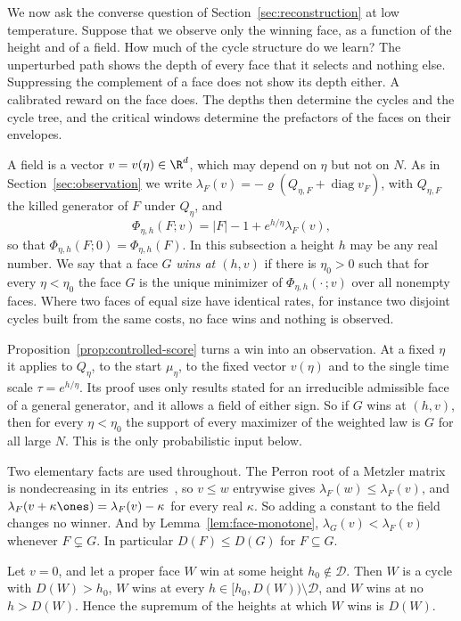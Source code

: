 We now ask the converse question of Section~\ref{sec:reconstruction} at low
temperature. Suppose that we observe only the winning face, as a function of
the height and of a field. How much of the cycle structure do we learn? The
unperturbed path shows the depth of every face that it selects and nothing
else. Suppressing the complement of a face does not show its depth either. A
calibrated reward on the face does. The depths then determine the cycles and
the cycle tree, and the critical windows determine the prefactors of the faces
on their envelopes.

A field is a vector $v=v(\eta)\in\R^d$, which may depend on $\eta$ but not on
$N$. As in Section~\ref{sec:observation} we write
$\lambda_F(v)=-\varrho(Q_{\eta,F}+\operatorname{diag}v_F)$, with $Q_{\eta,F}$ the
killed generator of $F$ under $Q_\eta$, and
\[
 \Phi_{\eta,h}(F;v)=|F|-1+e^{h/\eta}\lambda_F(v),
\]
so that $\Phi_{\eta,h}(F;0)=\Phi_{\eta,h}(F)$. In this subsection a height $h$
may be any real number. We say that a face $G$ \emph{wins at $(h,v)$} if there
is $\eta_0>0$ such that for every $\eta<\eta_0$ the face $G$ is the unique
minimizer of $\Phi_{\eta,h}(\cdot\,;v)$ over all nonempty faces. Where two
faces of equal size have identical rates, for instance two disjoint cycles
built from the same costs, no face wins and nothing is observed.

Proposition~\ref{prop:controlled-score} turns a win into an observation. At a
fixed $\eta$ it applies to $Q_\eta$, to the start $\mu_\eta$, to the fixed
vector $v(\eta)$ and to the single time scale $\tau=e^{h/\eta}$. Its proof uses
only results stated for an irreducible admissible face of a general generator,
and it allows a field of either sign. So if $G$ wins at $(h,v)$, then for every
$\eta<\eta_0$ the support of every maximizer of the weighted law is $G$ for all
large $N$. This is the only probabilistic input below.

Two elementary facts are used throughout. The Perron root of a Metzler matrix is
nondecreasing in its entries~\cite[Ch.~2]{bermanplemmons1994}, so $v\le w$
entrywise gives $\lambda_F(w)\le\lambda_F(v)$, and
$\lambda_F(v+\kappa\ones)=\lambda_F(v)-\kappa$ for every real $\kappa$. So
adding a constant to the field changes no winner. And by
Lemma~\ref{lem:face-monotone}, $\lambda_G(v)<\lambda_{F}(v)$ whenever
$F\subsetneq G$. In particular $D(F)\le D(G)$ for $F\subseteq G$.

\begin{proposition}\label{prop:unperturbed}
Let $v=0$, and let a proper face $W$ win at some height $h_0\notin\mathcal D$.
Then $W$ is a cycle with $D(W)>h_0$, $W$ wins at every
$h\in[h_0,D(W))\setminus\mathcal D$, and $W$ wins at no $h>D(W)$. Hence the
supremum of the heights at which $W$ wins is $D(W)$.
\end{proposition}

